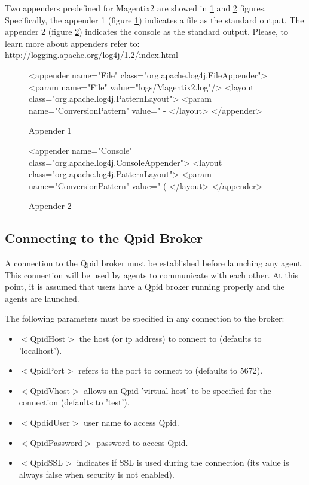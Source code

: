 Two appenders predefined for Magentix2 are showed in \ref{fig:Appender1} and \ref{fig:Appender2} figures. Specifically, the appender 1 (figure \ref{fig:Appender1}) indicates a file as the standard output. The appender 2 (figure \ref{fig:Appender2}) indicates the console as the standard output. Please, to learn more about appenders refer to: \url{http://logging.apache.org/log4j/1.2/index.html}


\begin{figure}
\begin{codigo}
<appender name="File" class="org.apache.log4j.FileAppender">
	<param name="File" value="logs/Magentix2.log"/>
	<layout class="org.apache.log4j.PatternLayout">
	    <param name="ConversionPattern" value="%
		   - %
	</layout>
</appender>
\end{codigo}
\caption{Appender 1}
\label{fig:Appender1}
\end{figure}


\begin{figure}
\begin{codigo}
<appender name="Console" class="org.apache.log4j.ConsoleAppender">
	<layout class="org.apache.log4j.PatternLayout">
	<param name="ConversionPattern" value="%
		(%
	</layout>
</appender>
\end{codigo}
\caption{Appender 2}
\label{fig:Appender2}
\end{figure}




\subsection{Connecting to the Qpid Broker}
\label{subsec:connecting}
A connection to the Qpid broker must be established before launching any agent. This connection will be used by agents to communicate with each other. At this point, it is  assumed that users have a Qpid broker running properly and the agents are launched.

The following parameters must be specified in any connection to the broker:

\begin{itemize}
\item$<$QpidHost$>$ the host (or ip address) to connect to (defaults to 'localhost').
\item$<$QpidPort$>$ refers to the port to connect to (defaults to 5672).
\item$<$QpidVhost$>$ allows an Qpid 'virtual host' to be specified for the connection (defaults to 'test').
\item$<$QpdidUser$>$ user name to access Qpid.
\item$<$QpidPassword$>$  password to access Qpid.
\item$<$QpidSSL$>$ indicates if  SSL is used during the connection (its value is always false when security is not enabled).
\end{itemize}

